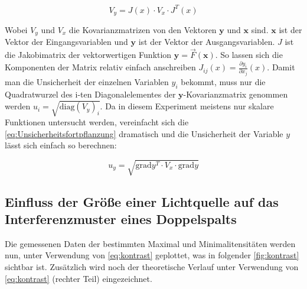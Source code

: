 \documentclass[11pt,ngerman]{scrartcl}
\begin{document}
\begin{equation}
	\label{eq:Unsicherheitsfortpflanzung}
	V_y = J(x) \cdot V_x \cdot J^{T}(x)
\end{equation}

\noindent Wobei $V_y$ und $V_x$ die Kovarianzmatrizen von den Vektoren $\bm{y}$ und $\bm{x}$ sind.
$\bm{x}$ ist der Vektor der Eingangsvariablen und $\bm{y}$ ist der Vektor der Ausgangsvariablen.
$J$ ist die Jakobimatrix der vektorwertigen Funktion $\bm{y} = \vec{F}(\bm{x})$.
So lassen sich die Komponenten der Matrix relativ einfach anschreiben $J_{ij}(x) = \frac{\partial{y_i}}{\partial{x_j}}(x)$.
Damit man die Unsicherheit der einzelnen Variablen $y_i$ bekommt, muss nur die Quadratwurzel des i-ten Diagonalelementes der
$\bm{y}$-Kovarianzmatrix genommen werden $u_i= \sqrt{\mathrm{diag}(V_y)_i}$.
Da in diesem Experiment meistens nur skalare Funktionen untersucht werden, vereinfacht
sich die \autoref{eq:Unsicherheitsfortpflanzung} dramatisch und die Unsicherheit
der Variable $y$ lässt sich einfach so berechnen:

\begin{equation}
	\label{eq:graduncentainty}
	u_y = \sqrt{\mathrm{grad} y^T \cdot V_x \cdot \mathrm{grad} y}
\end{equation}

\subsection{Einfluss der Größe einer Lichtquelle auf das Interferenzmuster eines Doppelspalts}

Die gemessenen Daten der bestimmten Maximal und Minimalitensitäten werden nun, unter
Verwendung von \autoref{eq:kontrast} geplottet, was in folgender \autoref{fig:kontrast}
sichtbar ist. Zusätzlich wird noch der theoretische Verlauf unter Verwendung
von \autoref{eq:kontrast} (rechter Teil) eingezeichnet.
\end{document}

